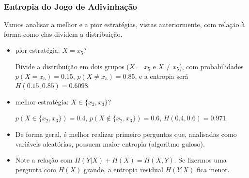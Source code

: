 \begin{frame}%
  \frametitle{Entropia do Jogo de Adivinhação}
  Vamos analisar a melhor e a pior estratégias, vistas anteriormente,
  com relação à forma como elas dividem a distribuição.

  \begin{itemize}
  \item pior estratégia: $X = x_5$?
 
  Divide a distribuição em dois grupos ($X=x_5$ e $X \neq x_5$), com probabilidades
  $p(X=x_5) = 0.15$, $p(X\neq x_5)=0.85$, e a entropia será $H(0.15 , 0.85) = 0.6098$.

  \item melhor estratégia: $X\in\{x_2,x_3\}$?
  
  $p(X\in\{x_2,x_3\})=0.4$, $p(X\notin\{x_2,x_3\})=0.6$, $H(0.4, 0.6)=0.971$.

  \item De forma geral, é melhor realizar primeiro perguntas que, analisadas como
  variáveis aleatórias, possuem maior entropia (algoritmo guloso).

  \item Note a relação com $H(Y|X) + H(X) = H(X,Y)$. Se fizermos uma pergunta com
  $H(X)$ grande, a entropia residual $H(Y|X)$ fica menor.
  \end{itemize}
\end{frame}



